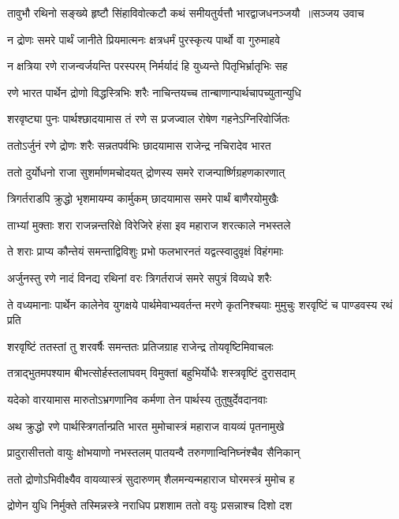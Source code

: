\threelineshloka
{तावुभौ रथिनो सङ्ख्ये हृष्टौ सिंहाविवोत्कटौ}
{कथं समीयतुर्यत्तौ भारद्वाजधनञ्जयौ ॥सञ्जय उवाच}
{}


\twolineshloka
{न द्रोणः समरे पार्थं जानीते प्रियमात्मनः}
{क्षत्रधर्मं पुरस्कृत्य पार्थो वा गुरुमाहवे}


\twolineshloka
{न क्षत्रिया रणे राजन्वर्जयन्ति परस्परम्}
{निर्मर्यादं हि युध्यन्ते पितृभिर्भ्रातृभिः सह}


\twolineshloka
{रणे भारत पार्थेन द्रोणो विद्धस्त्रिभिः शरैः}
{नाचिन्तयच्च तान्बाणान्पार्थचापच्युतान्युधि}


\twolineshloka
{शरवृष्ट्या पुनः पार्थश्छादयामास तं रणे}
{स प्रजज्वाल रोषेण गहनेऽग्निरिवोर्जितः}


\twolineshloka
{ततोऽर्जुनं रणे द्रोणः शरैः सन्नतपर्वभिः}
{छादयामास राजेन्द्र नचिरादेव भारत}


\twolineshloka
{ततो दुर्योधनो राजा सुशर्माणमचोदयत्}
{द्रोणस्य समरे राजन्पार्ष्णिग्रहणकारणात्}


\twolineshloka
{त्रिगर्तराडपि क्रुद्धो भृशमायम्य कार्मुकम्}
{छादयामास समरे पार्थं बाणैरयोमुखैः}


\twolineshloka
{ताभ्यां मुक्ताः शरा राजन्नन्तरिक्षे विरेजिरे}
{हंसा इव महाराज शरत्काले नभस्तले}


\twolineshloka
{ते शराः प्राप्य कौन्तेयं समन्ताद्विविशुः प्रभो}
{फलभारनतं यद्वत्स्वादुवृक्षं विहंगमाः}


\twolineshloka
{अर्जुनस्तु रणे नादं विनद्य रथिनां वरः}
{त्रिगर्तराजं समरे सपुत्रं विव्यधे शरैः}


\threelineshloka
{ते वध्यमानाः पार्थेन कालेनेव युगक्षये}
{पार्थमेवाभ्यवर्तन्त मरणे कृतनिश्चयाः}
{मुमुचुः शरवृष्टिं च पाण्डवस्य रथं प्रति}


\twolineshloka
{शरवृष्टिं ततस्तां तु शरवर्षैः समन्ततः}
{प्रतिजग्राह राजेन्द्र तोयवृष्टिमिवाचलः}


\twolineshloka
{तत्राद्भुतमपश्याम बीभत्सोर्हस्तलाघवम्}
{विमुक्तां बहुभिर्योधैः शस्त्रवृष्टिं दुरासदाम्}


\twolineshloka
{यदेको वारयामास मारुतोऽभ्रगणानिव}
{कर्मणा तेन पार्थस्य तुतुषुर्देवदानवाः}


\twolineshloka
{अथ क्रुद्धो रणे पार्थस्त्रिगर्तान्प्रति भारत}
{मुमोचास्त्रं महाराज वायव्यं पृतनामुखे}


\twolineshloka
{प्रादुरासीत्ततो वायुः क्षोभयाणो नभस्तलम्}
{पातयन्वै तरुगणान्विनिघ्नंश्चैव सैनिकान्}


\twolineshloka
{ततो द्रोणोऽभिवीक्ष्यैव वायव्यास्त्रं सुदारुणम्}
{शैलमन्यन्महाराज घोरमस्त्रं मुमोच ह}


\twolineshloka
{द्रोणेन युधि निर्मुक्ते तस्मिन्नस्त्रे नराधिप}
{प्रशशाम ततो वयुः प्रसन्नाश्च दिशो दश}


